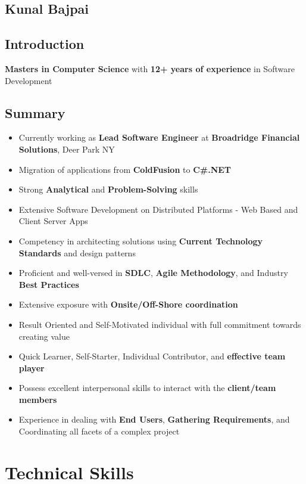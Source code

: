 \documentclass[letterpaper,11pt]{article}
\begin{document}
\begin{center}
\section{Kunal Bajpai}
\end{center}

\subsection{Introduction}
\textbf{Masters in Computer Science} with \textbf{12+ years of experience} in Software Development

\subsection{Summary}
\begin{itemize}
    \item Currently working as \textbf{Lead Software Engineer} at \textbf{Broadridge Financial Solutions}, Deer Park NY
    \item Migration of applications from \textbf{ColdFusion} to \textbf{C\#.NET}
    \item Strong \textbf{Analytical} and \textbf{Problem-Solving} skills
    \item Extensive Software Development on Distributed Platforms - Web Based and Client Server Apps
    \item Competency in architecting solutions using \textbf{Current Technology Standards} and design patterns
    \item Proficient and well-versed in \textbf{SDLC}, \textbf{Agile Methodology}, and Industry \textbf{Best Practices}
    \item Extensive exposure with \textbf{Onsite/Off-Shore coordination}
    \item Result Oriented and Self-Motivated individual with full commitment towards creating value
    \item Quick Learner, Self-Starter, Individual Contributor, and \textbf{effective team player}
    \item Possess excellent interpersonal skills to interact with the \textbf{client/team members}
    \item Experience in dealing with \textbf{End Users}, \textbf{Gathering Requirements}, and Coordinating all facets of a complex project
\end{itemize}

\section{Technical Skills}
\end{document}

